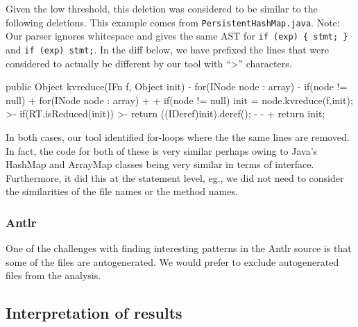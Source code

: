 Given the low threshold, this deletion was considered to be similar to the
following deletions. This example comes from {\tt PersistentHashMap.java}.
Note: Our parser ignores whitespace and gives the same AST for \verb|if (exp) { stmt; }|
and \verb|if (exp) stmt;|. In the diff below, we have prefixed the
lines that were considered to actually be different by our tool with ``>''
characters.

\begin{java}
 public Object kvreduce(IFn f, Object init){
-    for(INode node : array){
-        if(node != null){
+    for(INode node : array)
+        {
+        if(node != null)
             init = node.kvreduce(f,init);
>-                if(RT.isReduced(init))
>-                        return ((IDeref)init).deref();
-               }
-           }
+        }
     return init;
 }
\end{java}

In both cases, our tool identified for-loops where the the same lines are
removed. In fact, the code for both of these is very similar perhaps owing to
Java's HashMap and ArrayMap classes being very similar in terms of interface.
Furthermore, it did this at the statement level, eg., we did not need to
consider the similarities of the file names or the method names.


\subsubsection{Antlr}

One of the challenges with finding interesting patterns in the Antlr source is
that some of the files are autogenerated. We would prefer to exclude
autogenerated files from the analysis.

\subsection{Interpretation of results}


